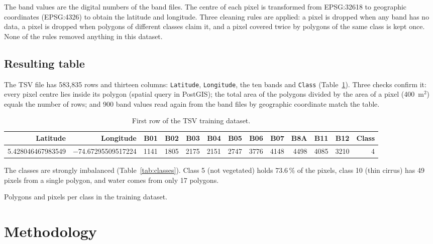 \documentclass[11pt,a4paper]{article}
\begin{document}
The band values are the digital numbers of the band files. The centre of each
pixel is transformed from EPSG:32618 to geographic coordinates (EPSG:4326) to
obtain the latitude and longitude. Three cleaning rules are applied: a pixel
is dropped when any band has no data, a pixel is dropped when polygons of
different classes claim it, and a pixel covered twice by polygons of the same
class is kept once. None of the rules removed anything in this dataset.

\subsection{Resulting table}

The TSV file has 583,835 rows and thirteen columns: \texttt{Latitude},
\texttt{Longitude}, the ten bands and \texttt{Class}
(Table~\ref{tab:sample}). Three checks confirm it: every pixel centre lies
inside its polygon (spatial query in PostGIS); the total area of the polygons
divided by the area of a pixel (400~m$^2$) equals the number of rows; and 900
band values read again from the band files by geographic coordinate match the
table.

\begin{table}[H]
\centering\scriptsize
\setlength{\tabcolsep}{3.5pt}
\caption{First row of the TSV training dataset.}
\label{tab:sample}
\begin{tabular}{rrrrrrrrrrrrr}
\toprule
Latitude & Longitude & B01 & B02 & B03 & B04 & B05 & B06 & B07 & B8A & B11 & B12 & Class \\
\midrule
5.428046467983549 & $-$74.67295509517224 & 1141 & 1805 & 2175 & 2151 & 2747 & 3776 & 4148 & 4498 & 4085 & 3210 & 4 \\
\bottomrule
\end{tabular}
\end{table}

The classes are strongly imbalanced (Table~\ref{tab:classes}). Class 5 (not
vegetated) holds 73.6\,\% of the pixels, class 10 (thin cirrus) has 49 pixels
from a single polygon, and water comes from only 17 polygons.

\begin{table}[H]
\centering\small
\caption{Polygons and pixels per class in the training dataset.}
\label{tab:classes}

\end{table}

\section{Methodology}
\end{document}
